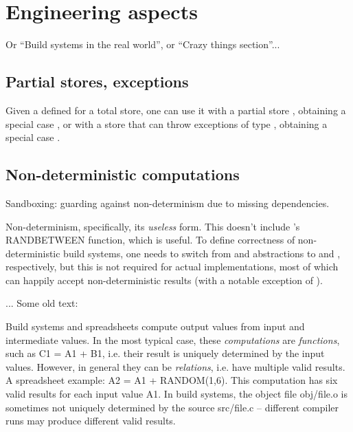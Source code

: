\clearpage
\section{Engineering aspects}\label{sec-engineering}

Or ``Build systems in the real world'', or ``Crazy things section''...

\subsection{Partial stores, exceptions}

Given a  defined for a total store, one can use it
with a partial store , obtaining a special case
, or with a store  that can
throw exceptions of type , obtaining a special case
.

\subsection{Non-deterministic computations}\label{sec-non-determinism}

Sandboxing: guarding against non-determinism due to missing dependencies.


Non-determinism, specifically, its \emph{useless} form. This doesn't
include \Excel's \textsf{RANDBETWEEN} function, which is useful.
To define correctness of non-deterministic build systems, one needs to
switch from  and  abstractions to
 and , respectively, but this is not
required for actual implementations, most of which can happily accept
non-deterministic results (with a notable exception of \Buck).

... Some old text:

Build systems and spreadsheets compute output values from input and intermediate
values. In the most typical case, these \emph{computations} are \emph{functions},
such as \textsf{C1 = A1 + B1}, i.e. their result is uniquely determined by the
input values. However, in general they can be \emph{relations}, i.e. have
multiple valid results. A spreadsheet example: \textsf{A2 = A1 + RANDOM(1,6)}.
This computation has six valid results for each input value \textsf{A1}. In
build systems, the object file \textsf{obj/file.o} is sometimes not uniquely
determined by the source \textsf{src/file.c} -- different compiler runs may
produce different valid results.

